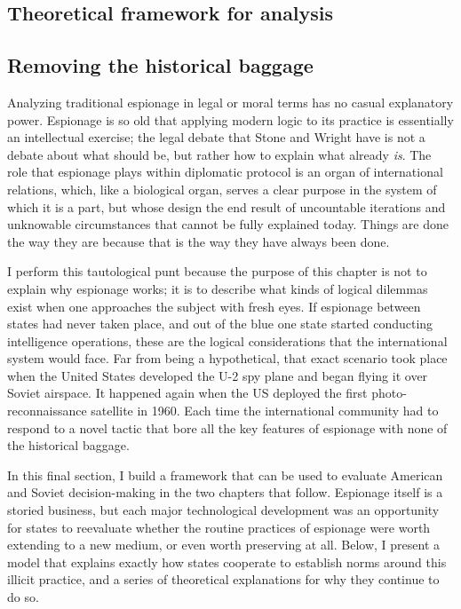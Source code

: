 \documentclass{memoir}
\begin{document}
\begin{refsegment}

\section{Theoretical framework for analysis}
\subsection{Removing the historical baggage}
Analyzing traditional espionage in legal or moral terms has no casual explanatory power. Espionage is so old that applying modern logic to its practice is essentially an intellectual exercise; the legal debate that Stone and Wright have is not a debate about what should be, but rather how to explain what already \emph{is}. The role that espionage plays within diplomatic protocol is an organ of international relations, which, like a biological organ, serves a clear purpose in the system of which it is a part, but whose design the end result of uncountable iterations and unknowable circumstances that cannot be fully explained today. Things are done the way they are because that is the way they have always been done.

I perform this tautological punt because the purpose of this chapter is not to explain why espionage works; it is to describe what kinds of logical dilemmas exist when one approaches the subject with fresh eyes. If espionage between states had never taken place, and out of the blue one state started conducting intelligence operations, these are the logical considerations that the international system would face. Far from being a hypothetical, that exact scenario took place when the United States developed the U-2 spy plane and began flying it over Soviet airspace. It happened again when the US deployed the first photo-reconnaissance satellite in 1960. Each time the international community had to respond to a novel tactic that bore all the key features of espionage with none of the historical baggage.

In this final section, I build a framework that can be used to evaluate American and Soviet decision-making in the two chapters that follow. Espionage itself is a storied business, but each major technological development was an opportunity for states to reevaluate whether the routine practices of espionage were worth extending to a new medium, or even worth preserving at all. Below, I present a model that explains exactly how states cooperate to establish norms around this illicit practice, and a series of theoretical explanations for why they continue to do so.


\end{refsegment}
\end{document}
